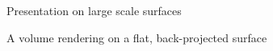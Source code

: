\documentclass[review,journal]{vgtc}         %
\begin{document}
\begin{figure}[htb]
	\centering
	\caption{Presentation on large scale surfaces}
	\label{img:dome_presentation}
\end{figure}

\begin{figure}[htb]
	\centering
	\caption{A volume rendering on a flat, back-projected surface}
	\label{img:vr_dvr}
\end{figure}


\end{document}
